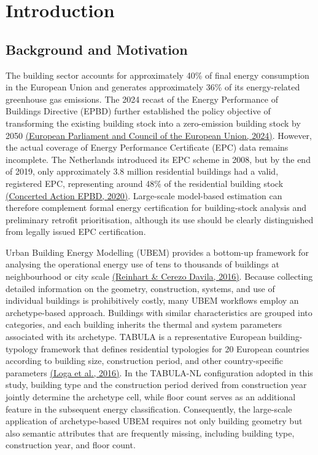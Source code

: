 \chapter{Introduction}
\label{ch:1}
\label{sec:1}


\section{Background and Motivation}
\label{sec:1_1}


The building sector accounts for approximately 40\% of final energy consumption in the European Union and generates approximately 36\% of its energy-related greenhouse gas emissions. The 2024 recast of the Energy Performance of Buildings Directive (EPBD) further established the policy objective of transforming the existing building stock into a zero-emission building stock by 2050 \hyperlink{ref:epbd2024}{(European Parliament and Council of the European Union, 2024)}. However, the actual coverage of Energy Performance Certificate (EPC) data remains incomplete. The Netherlands introduced its EPC scheme in 2008, but by the end of 2019, only approximately 3.8 million residential buildings had a valid, registered EPC, representing around 48\% of the residential building stock \hyperlink{ref:caepbd2020}{(Concerted Action EPBD, 2020)}. Large-scale model-based estimation can therefore complement formal energy certification for building-stock analysis and preliminary retrofit prioritisation, although its use should be clearly distinguished from legally issued EPC certification.


Urban Building Energy Modelling (UBEM) provides a bottom-up framework for analysing the operational energy use of tens to thousands of buildings at neighbourhood or city scale \hyperlink{ref:reinhart2016}{(Reinhart \& Cerezo Davila, 2016)}. Because collecting detailed information on the geometry, construction, systems, and use of individual buildings is prohibitively costly, many UBEM workflows employ an archetype-based approach. Buildings with similar characteristics are grouped into categories, and each building inherits the thermal and system parameters associated with its archetype. TABULA is a representative European building-typology framework that defines residential typologies for 20 European countries according to building size, construction period, and other country-specific parameters \hyperlink{ref:loga2016}{(Loga et al., 2016)}. In the TABULA-NL configuration adopted in this study, building type and the construction period derived from construction year jointly determine the archetype cell, while floor count serves as an additional feature in the subsequent energy classification. Consequently, the large-scale application of archetype-based UBEM requires not only building geometry but also semantic attributes that are frequently missing, including building type, construction year, and floor count.


